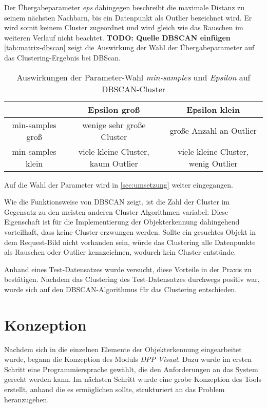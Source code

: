 \documentclass[
    type=Projektarbeit,
    status=draft, %
    language=german, %
    bibengine=bibtex,
]{unibwm-inf-thesis}
\newcommand{\todo}[1]{\textbf{TODO: #1}}
\begin{document}
    Der Übergabeparameter \textit{eps} dahingegen beschreibt die maximale Distanz zu seinem nächsten Nachbarn, bis ein Datenpunkt als Outlier bezeichnet wird.
    Er wird somit keinem Cluster zugeordnet und wird gleich wie das Rauschen im weiteren Verlauf nicht beachtet. \todo{Quelle DBSCAN einfügen}
    \autoref{tab:matrix-dbscan} zeigt die Auswirkung der Wahl der Übergabeparameter auf das Clustering-Ergebnis bei DBScan.
    \begin{table}[h]
        \centering
        \begin{tabular}{c | c | c}
            & Epsilon groß & Epsilon klein \\ \hline
            min-samples groß & wenige sehr große Cluster & große Anzahl an Outlier\\ \hline
            min-samples klein & viele kleine Cluster, kaum Outlier & viele kleine Cluster, wenig Outlier
        \end{tabular}
        \caption{Auswirkungen der Parameter-Wahl \textit{min-samples} und \textit{Epsilon} auf DBSCAN-Cluster}
        \label{tab:matrix-dbscan}
    \end{table}

    Auf die Wahl der Parameter wird in \autoref{sec:umsetzung} weiter eingegangen.

    Wie die Funktionsweise von DBSCAN zeigt, ist die Zahl der Cluster im Gegensatz zu den meisten anderen Cluster-Algorithmen variabel.
    Diese Eigenschaft ist für die Implementierung der Objekterkennung dahingehend vorteilhaft, dass keine Cluster \glqq erzwungen\grqq{} werden.
    Sollte ein gesuchtes Objekt in dem Request-Bild nicht vorhanden sein, würde das Clustering alle Datenpunkte als Rauschen oder Outlier kennzeichnen, wodurch kein Cluster entstünde.

    Anhand eines Test-Datensatzes wurde versucht, diese Vorteile in der Praxis zu bestätigen.
    Nachdem das Clustering des Test-Datensatzes durchwegs positiv war, wurde sich auf den DBSCAN-Algorithmus für das Clustering entschieden.

    
    \section{Konzeption}
    Nachdem sich in die einzelnen Elemente der Objekterkennung eingearbeitet wurde, begann die Konzeption des Moduls \textit{DPP Visual}.
    Dazu wurde im ersten Schritt eine Programmiersprache gewählt, die den Anforderungen an das System gerecht werden kann.
    Im nächsten Schritt wurde eine grobe Konzeption des Tools erstellt, anhand die es ermöglichen sollte, strukturiert an das Problem heranzugehen.
\end{document}
